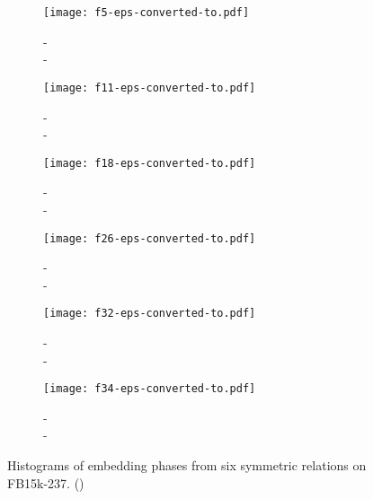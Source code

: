 \documentclass{article} \usepackage{iclr2019_conference,times}
\begin{document}
\begin{figure}
\centering
\begin{subfigure}{0.45\textwidth}
  \centering
  \texttt{[image: f5-eps-converted-to.pdf]}
  \caption{-\\ - }
\end{subfigure}\begin{subfigure}{0.45\textwidth}
  \centering
  \texttt{[image: f11-eps-converted-to.pdf]}
  \caption{-\\ - }
\end{subfigure}
\begin{subfigure}{0.45\textwidth}
  \centering
  \texttt{[image: f18-eps-converted-to.pdf]}
  \caption{-\\- }
\end{subfigure}
\begin{subfigure}{0.45\textwidth}
  \centering
  \texttt{[image: f26-eps-converted-to.pdf]}
  \caption{-\\ - }
\end{subfigure}
\begin{subfigure}{0.45\textwidth}
  \centering
  \texttt{[image: f32-eps-converted-to.pdf]}
  \caption{-\\ -\\ }
\end{subfigure}
\begin{subfigure}{0.45\textwidth}
  \centering
  \texttt{[image: f34-eps-converted-to.pdf]}
  \caption{-\\ - }
\end{subfigure}
\caption{Histograms of embedding phases from six symmetric relations on FB15k-237. ()}
\label{fig:fb1}
\end{figure}
\end{document}
